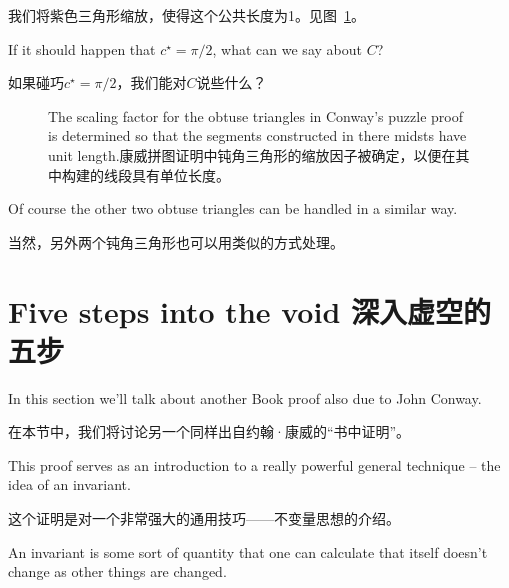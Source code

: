我们将紫色三角形缩放，使得这个公共长度为1。见图~\ref{fig:morley_conway_puzzle_scaling}。

\begin{exer}
If it should happen that $c^\star = \pi/2$, what can we 
say about $C$?
\end{exer}

\begin{exer}
如果碰巧$c^\star = \pi/2$，我们能对$C$说些什么？
\end{exer}

\begin{figure}[!hbtp] 
\begin{center}

\end{center}
\caption[Scaling in Conway's puzzle proof.康威拼图证明中的缩放。]{The scaling factor for
the obtuse triangles in Conway's puzzle proof is determined so that 
the segments constructed in there midsts have unit length.康威拼图证明中钝角三角形的缩放因子被确定，以便在其中构建的线段具有单位长度。}
\label{fig:morley_conway_puzzle_scaling}
\end{figure}
 
Of course the other two obtuse triangles can be handled in a similar way.

当然，另外两个钝角三角形也可以用类似的方式处理。

\clearpage





\newpage

\section{Five steps into the void 深入虚空的五步}
\label{sec:5_steps}

In this section we'll talk about another Book proof also due to John
Conway.

在本节中，我们将讨论另一个同样出自约翰·康威的“书中证明”。

This proof serves as an introduction to a really powerful
general technique -- the idea of an invariant.

这个证明是对一个非常强大的通用技巧——不变量思想的介绍。

An invariant is some
sort of quantity that one can calculate that itself doesn't change as 
other things are changed.

